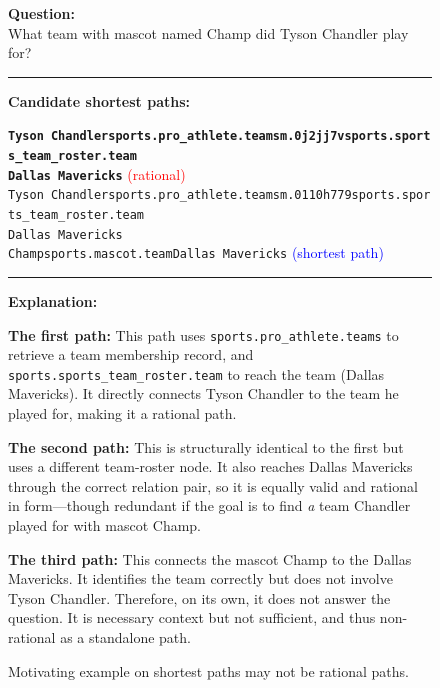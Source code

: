 \begin{figure}[t]
\begin{tcolorbox}[colback=gray!5!white,
                  colframe=gray!75!black,
                  title=WebQTrn-2946\_93c6dae3d218dbe112d4120f45c93298]
\scriptsize

\textbf{Question:}\\
What team with mascot named Champ did Tyson Chandler play for?

\rule{\linewidth}{0.4pt}

\textbf{Candidate shortest paths:}\\[2pt]
{\raggedright
\texttt{\textbf{Tyson Chandler\patharrow sports.pro\_athlete.teams\patharrow m.0j2jj7v\patharrow sports.sports\_team\_roster.team \\ \patharrow Dallas Mavericks}}\hfill
\textcolor{red}{(rational)}\\[6pt]

\texttt{Tyson Chandler\patharrow sports.pro\_athlete.teams\patharrow m.0110h779\patharrow sports.sports\_team\_roster.team \\ \patharrow Dallas Mavericks}\\[6pt]

\texttt{Champ\patharrow sports.mascot.team\patharrow Dallas Mavericks}\hfill
\textcolor{blue}{(shortest path)}\\[6pt]
\par}

\rule{\linewidth}{0.4pt}

\textbf{Explanation:}\\[2pt]
{\raggedright
\textbf{The first path:} This path uses \texttt{sports.pro\_athlete.teams} to retrieve a team membership record, and \texttt{sports.sports\_team\_roster.team} to reach the team (Dallas Mavericks). It directly connects Tyson Chandler to the team he played for, making it a rational path.\par\vspace{6pt}

\textbf{The second path:} This is structurally identical to the first but uses a different team-roster node. It also reaches Dallas Mavericks through the correct relation pair, so it is equally valid and rational in form—though redundant if the goal is to find \emph{a} team Chandler played for with mascot Champ.\par\vspace{6pt}

\textbf{The third path:} This connects the mascot Champ to the Dallas Mavericks. It identifies the team correctly but does not involve Tyson Chandler. Therefore, on its own, it does not answer the question. It is necessary context but not sufficient, and thus non-rational as a standalone path.\par}

\end{tcolorbox}
\caption{Motivating example on shortest paths may not be rational paths.}
\label{fig:type2_no1}
\end{figure}



